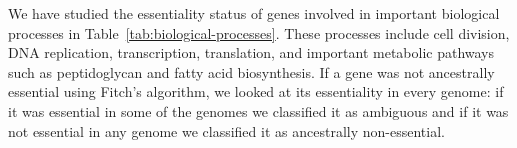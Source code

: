 \documentclass[12pt,letterpaper]{article}
\begin{document}
We have studied the essentiality status of genes involved in important biological processes in Table~\ref{tab:biological-processes}. These processes include cell division, DNA replication, transcription, translation, and important metabolic pathways such as peptidoglycan and fatty acid biosynthesis. If a gene was not ancestrally essential using Fitch's algorithm, we looked at its essentiality in every genome: if it was essential in some of the genomes we classified it as ambiguous and if it was not essential in any genome we classified it as ancestrally non-essential.
\end{document}
